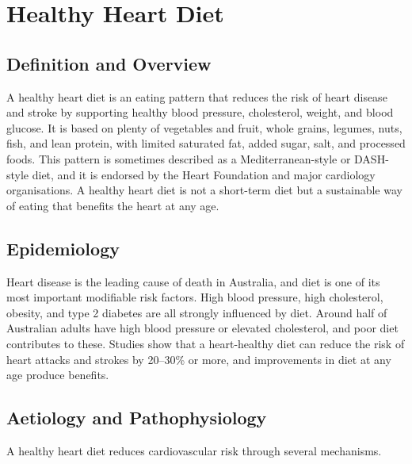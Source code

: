 \chapter{Healthy Heart Diet}

\section*{Definition and Overview}
A healthy heart diet is an eating pattern that reduces the risk of heart disease and stroke by supporting healthy blood pressure, cholesterol, weight, and blood glucose. It is based on plenty of vegetables and fruit, whole grains, legumes, nuts, fish, and lean protein, with limited saturated fat, added sugar, salt, and processed foods. This pattern is sometimes described as a Mediterranean-style or DASH-style diet, and it is endorsed by the Heart Foundation and major cardiology organisations. A healthy heart diet is not a short-term diet but a sustainable way of eating that benefits the heart at any age.

\section*{Epidemiology}
Heart disease is the leading cause of death in Australia, and diet is one of its most important modifiable risk factors. High blood pressure, high cholesterol, obesity, and type 2 diabetes are all strongly influenced by diet. Around half of Australian adults have high blood pressure or elevated cholesterol, and poor diet contributes to these. Studies show that a heart-healthy diet can reduce the risk of heart attacks and strokes by 20--30\% or more, and improvements in diet at any age produce benefits.

\section*{Aetiology and Pathophysiology}
A healthy heart diet reduces cardiovascular risk through several mechanisms.

